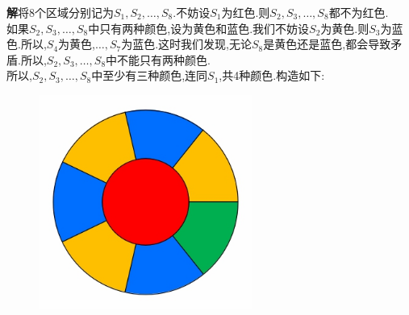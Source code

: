 \documentclass[UTF8]{ctexart}
\begin{document}
\hspace*{2em}\textbf{解}\quad 将8个区域分别记为$S_1,S_2,\dots,S_8$.不妨设$S_1$为红色.则$S_2,S_3,\dots,S_8$都不为红色.\\
\hspace*{2em}如果$S_2,S_3,\dots,S_8$中只有两种颜色,设为黄色和蓝色.我们不妨设$S_2$为黄色.则$S_3$为蓝色.所以,$S_4$为黄色,$\dots,S_7$为蓝色.这时我们发现,无论$S_8$是黄色还是蓝色,都会导致矛盾.所以,$S_2,S_3,\dots,S_8$中不能只有两种颜色.\\
\hspace*{2em}所以,$S_2,S_3,\dots,S_8$中至少有三种颜色,连同$S_1$,共4种颜色.构造如下:
\begin{figure}[!ht]
\centering
\includegraphics[width=7cm]{example.jpg}
\end{figure}
\end{document}
